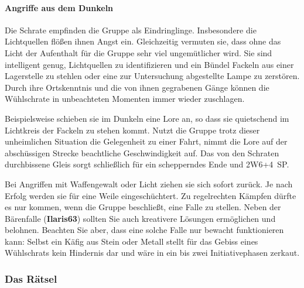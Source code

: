 \paragraph{Angriffe aus dem Dunkeln}

Die Schrate empfinden die Gruppe als Eindringlinge.
Insbesondere die Lichtquellen flößen ihnen Angst ein.
Gleichzeitig vermuten sie, dass ohne das Licht der Aufenthalt für die Gruppe sehr viel ungemütlicher wird.
Sie sind intelligent genug, Lichtquellen zu identifizieren und ein Bündel Fackeln aus einer Lagerstelle zu stehlen oder eine zur Untersuchung abgestellte Lampe zu zerstören.
Durch ihre Ortskenntnis und die von ihnen gegrabenen Gänge können die Wühlschrate in unbeachteten Momenten immer wieder zuschlagen.

 Beispielsweise schieben sie im Dunkeln eine Lore an, so dass sie quietschend im Lichtkreis der Fackeln zu stehen kommt.
Nutzt die Gruppe trotz dieser unheimlichen Situation die Gelegenheit zu einer Fahrt, nimmt die Lore auf der abschüssigen Strecke beachtliche Geschwindigkeit auf.
Das von den Schraten durchbissene Gleis sorgt schließlich für ein schepperndes Ende und 2W6+4~SP.

Bei Angriffen mit Waffengewalt oder Licht ziehen sie sich sofort zurück. Je nach Erfolg werden sie für eine Weile eingeschüchtert.
Zu regelrechten Kämpfen dürfte es nur kommen, wenn die Gruppe beschließt, eine Falle zu stellen.
Neben der Bärenfalle (\textbf{Ilaris63}) sollten Sie auch kreativere Lösungen ermöglichen und belohnen.
Beachten Sie aber, dass eine solche Falle nur bewacht funktionieren kann:
Selbst ein Käfig aus Stein oder Metall stellt für das Gebiss eines Wühlschrats kein Hindernis dar und wäre in ein bis zwei Initiativephasen zerkaut.





\subsubsection{Das Rätsel}

